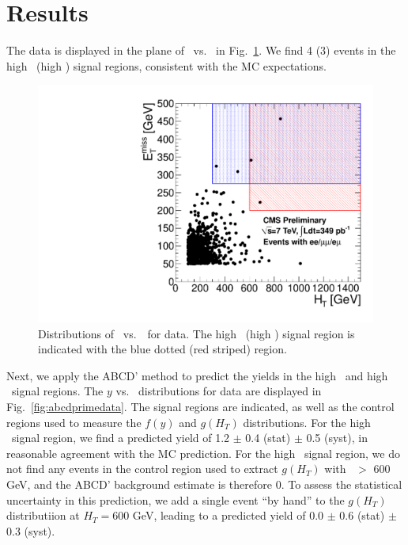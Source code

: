\section{Results}
\label{sec:results}

The data is displayed in the plane of \MET\ vs. \Ht\ in Fig.~\ref{fig:met_ht}.
We find 4 (3) events in the high \MET\ (high \Ht) signal regions, consistent
with the MC expectations. 

\begin{figure}[tbh]
\begin{center}
\includegraphics[width=0.65\linewidth]{plots_final/met_ht_349pb.pdf}
\caption{\label{fig:met_ht}\protect Distributions of \MET\ vs.\ \HT\   
for data. The high \MET\ (high \Ht) signal region is indicated with the
blue dotted (red striped) region.}
\end{center}
\end{figure}

Next, we apply the ABCD' method to predict the yields in the high \met\ and high \Ht\
signal regions. 
The $y$ vs. \Ht\ distributions for data are displayed in 
Fig.~\ref{fig:abcdprimedata}. 
The signal regions are indicated, as well as the control 
regions used to measure the $f(y)$ and $g(H_T)$ distributions. 
For the high \met\
signal region, we find a predicted yield of 1.2 $\pm$ 0.4 (stat) $\pm$ 0.5 (syst), 
in reasonable agreement with the MC prediction. For the high \Ht\ signal region, we 
do not find any events in the control region used to extract $g(H_T)$ with \Ht\ $>$ 600 GeV,
and the ABCD' background estimate is therefore 0. To assess the statistical uncertainty
in this prediction, we add a single event ``by hand'' to the $g(H_T)$ distributiion
at $H_T = 600$ GeV, leading to a predicted yield of 0.0 $\pm$ 0.6 (stat) $\pm$ 0.3 (syst).

